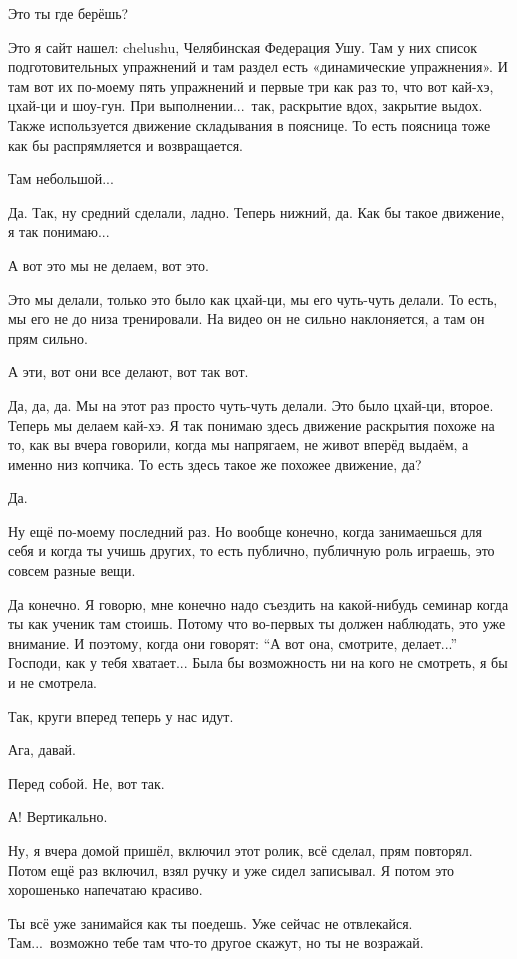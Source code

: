\M
Это ты где берёшь?

\I
Это я сайт нашел: chelushu, Челябинская Федерация Ушу.
Там у них список подготовительных упражнений и там
раздел есть «динамические упражнения». И
там вот их по-моему пять упражнений и первые три как раз то, что вот кай-хэ, цхай-ци и шоу-гун.
При выполнении...\ так, раскрытие вдох, закрытие выдох.
Также используется движение складывания в пояснице.
То есть поясница тоже как бы распрямляется и возвращается.

\M
Там небольшой...

\I
Да. Так, ну средний сделали, ладно. Теперь нижний, да. Как
бы такое движение, я так понимаю...

\M
А вот это мы не делаем, вот это.

\I
Это мы делали, только это было как цхай-ци, мы его
чуть-чуть делали. То есть, мы его не до
низа тренировали.
На видео он не сильно наклоняется, а там он прям сильно.

\M
А эти, вот они все делают, вот так вот.

\I
Да, да, да.
Мы на этот раз просто чуть-чуть делали.
Это было цхай-ци, второе.
Теперь мы делаем кай-хэ.
Я так понимаю здесь движение раскрытия похоже на то, как вы вчера говорили,
когда мы напрягаем, не живот вперёд выдаём, а именно низ копчика.
То есть здесь такое же похожее движение, да?

\M
Да.

\I
Ну ещё по-моему последний раз.
Но вообще
конечно, когда занимаешься для себя и когда ты учишь других, то есть публично, публичную роль
играешь, это совсем разные вещи.

\M
Да конечно.
Я говорю, мне конечно надо съездить на какой-нибудь семинар когда ты как ученик там стоишь.
Потому что во-первых ты должен наблюдать, это уже внимание.
И поэтому, когда они говорят: ``А вот она,
смотрите, делает...'' Господи, как у тебя хватает... Была бы возможность ни на кого не смотреть,
я бы и не смотрела.

\I
Так, круги вперед теперь у нас идут.

\M
Ага, давай.

\I
Перед собой. Не, вот так.

\M
А! Вертикально.

\I
Ну, я вчера домой пришёл, включил этот ролик, всё сделал, прям повторял.
Потом ещё раз включил, взял ручку и уже сидел записывал. Я потом это хорошенько напечатаю красиво.

\M
Ты всё уже занимайся как ты поедешь.
Уже сейчас не отвлекайся. Там...\ возможно тебе там что-то другое скажут, но ты не возражай.

